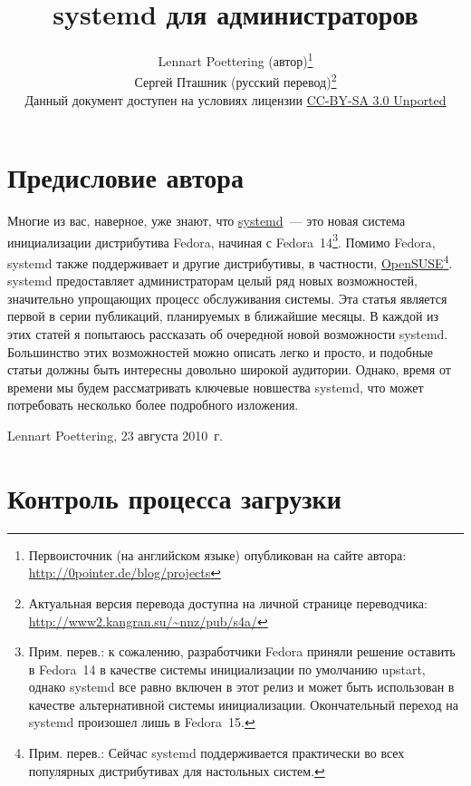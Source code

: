 \documentclass[10pt,oneside,a4paper]{article}
\newcommand{\sectiona}[1]{\section*{#1}\addcontentsline{toc}{section}{#1}}
\begin{document}
\sloppy
\title{systemd для администраторов}
\author{Lennart Poettering (автор)\thanks{Первоисточник (на английском
языке) опубликован на сайте автора: \url{http://0pointer.de/blog/projects}}\\%
Сергей Пташник (русский перевод)\thanks{Актуальная версия перевода
доступна на личной странице переводчика:
\url{http://www2.kangran.su/~nnz/pub/s4a/}}\\%
\small Данный документ доступен на условиях лицензии
\href{http://creativecommons.org/licenses/by-sa/3.0/legalcode}{CC-BY-SA 3.0
Unported}}
\maketitle
\tableofcontents
\sectiona{Предисловие автора}
Многие из вас, наверное, уже знают, что
\href{http://www.freedesktop.org/wiki/Software/systemd}{systemd}~--- это новая
система инициализации дистрибутива Fedora, начиная с Fedora~14\footnote{Прим.
перев.: к сожалению, разработчики Fedora приняли решение оставить в Fedora~14 в
качестве системы инициализации по умолчанию upstart, однако systemd все равно
включен в этот релиз и может быть использован в качестве альтернативной системы
инициализации. Окончательный переход на systemd произошел лишь в Fedora~15.}.
Помимо Fedora, systemd также поддерживает и другие дистрибутивы, в частности,
\href{http://en.opensuse.org/SDB:Systemd}{OpenSUSE}\footnote{Прим. перев.:
Сейчас systemd поддерживается практически во всех популярных дистрибутивах для
настольных систем.}.  systemd предоставляет администраторам целый ряд новых
возможностей, значительно упрощающих процесс обслуживания системы. Эта статья
является первой в серии публикаций, планируемых в ближайшие месяцы. В каждой из
этих статей я попытаюсь рассказать об очередной новой возможности systemd.
Большинство этих возможностей можно описать легко и просто, и подобные статьи
должны быть интересны довольно широкой аудитории.  Однако, время от времени мы
будем рассматривать ключевые новшества systemd, что может потребовать несколько
более подробного изложения.
\begin{flushright}
	Lennart Poettering, 23 августа 2010~г.
\end{flushright}

\section{Контроль процесса загрузки}
\label{sec:verify}
\end{document}
